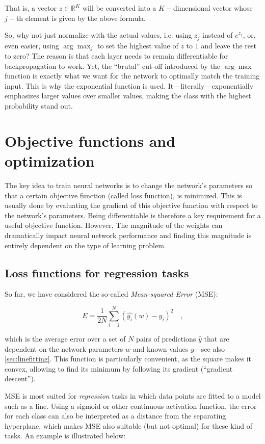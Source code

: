 That is, a vector $z \in \mathbb{R}^K$ will be converted into a $K-$dimensional vector whose $j-$th element is given by the above formula.

So, why not just normalize with the actual values, i.e. using $z_j$ instead of $e^{z_j}$, or, even easier, using $\arg \max_j$ to set the highest value of $z$ to $1$ and leave the rest to zero?
The reason is that each layer needs to remain differentiable for backpropagation to work.
Yet, the ``brutal'' cut-off introduced by the $\arg \max$ function is exactly what we want for the network to optimally match the training input. This is why the exponential function is used. It---literally---exponentially emphasizes larger values over smaller values, making the class with the highest probability stand out.

\section{Objective functions and optimization}

The key idea to train neural networks is to change the network's parameters so that a certain objective function (called loss function), is minimized.
This is usually done by evaluating the gradient of this objective function with respect to the network's parameters. Being differentiable is therefore a key requirement for a useful objective function.
However, The magnitude of the weights can dramatically impact neural network performance and finding this magnitude is entirely dependent on the type of learning problem.

\subsection{Loss functions for regression tasks}
So far, we have considered the so-called \textsl{Mean-squared Error} (MSE):

\begin{equation}
E=\frac{1}{2N}\sum_{i=1}^{N}(\hat{y_i}(w)-y_i)^2\quad ,
\end{equation}

which is the average error over a set of $N$ pairs of predictions $\hat{y}$ that are dependent on the network parameters $w$ and known values $y$---see also \cref{sec:linefitting}. This function is particularly convenient, as the square makes it convex, allowing to find its minimum by following its gradient (``gradient descent'').

MSE is most suited for \textsl{regression} tasks in which data points are fitted to a model such as a line. Using a sigmoid or other continuous activation function, the error for each class can also be interpreted as a distance from the separating hyperplane, which makes MSE also suitable (but not optimal) for these kind of tasks. An example is illustrated below:

